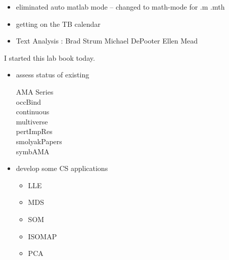 \documentclass[hyperref]{labbook}
\begin{document}



\begin{itemize}
\item eliminated auto matlab mode -- changed to math-mode for .m .mth
\item getting on the TB calendar
\end{itemize}

\begin{itemize}
\item Text Analysis : Brad Strum Michael DePooter Ellen Mead
\end{itemize}




I started this lab book today.




\begin{itemize}
\item assess status of existing
  \begin{description}
  \item[AMA Series]
\item[occBind]
\item[continuous]
\item[multiverse]
\item[pertImpRes]
\item[smolyakPapers]
\item[symbAMA]
  \end{description}

\item develop some CS applications
  \begin{itemize}
  \item LLE
  \item MDS
  \item SOM
  \item ISOMAP
  \item PCA
  \end{itemize}

\end{itemize}

\end{document}
